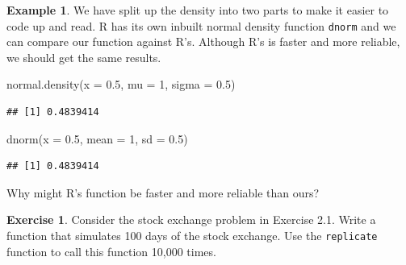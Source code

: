 \documentclass[
]{book}
\newenvironment{Shaded}{\begin{snugshade}}{\end{snugshade}}
\newcommand{\AttributeTok}[1]{\textcolor[rgb]{0.77,0.63,0.00}{#1}}
\newcommand{\DecValTok}[1]{\textcolor[rgb]{0.00,0.00,0.81}{#1}}
\newcommand{\FloatTok}[1]{\textcolor[rgb]{0.00,0.00,0.81}{#1}}
\newcommand{\FunctionTok}[1]{\textcolor[rgb]{0.00,0.00,0.00}{#1}}
\newcommand{\NormalTok}[1]{#1}
\theoremstyle{definition}
\theoremstyle{definition}
\newtheorem{example}{Example}[chapter]
\theoremstyle{definition}
\newtheorem{exercise}{Exercise}[chapter]
\theoremstyle{definition}
\theoremstyle{remark}
\begin{document}
\begin{example}
We have split up the density into two parts to make it easier to code up and read. R has its own inbuilt normal density function \texttt{dnorm} and we can compare our function against R's. Although R's is faster and more reliable, we should get the same results.

\begin{Shaded}
\begin{Highlighting}[]
\FunctionTok{normal.density}\NormalTok{(}\AttributeTok{x =} \FloatTok{0.5}\NormalTok{, }\AttributeTok{mu =} \DecValTok{1}\NormalTok{, }\AttributeTok{sigma =} \FloatTok{0.5}\NormalTok{)}
\end{Highlighting}
\end{Shaded}

\begin{verbatim}
## [1] 0.4839414
\end{verbatim}

\begin{Shaded}
\begin{Highlighting}[]
\FunctionTok{dnorm}\NormalTok{(}\AttributeTok{x =} \FloatTok{0.5}\NormalTok{, }\AttributeTok{mean =} \DecValTok{1}\NormalTok{, }\AttributeTok{sd =} \FloatTok{0.5}\NormalTok{)}
\end{Highlighting}
\end{Shaded}

\begin{verbatim}
## [1] 0.4839414
\end{verbatim}

Why might R's function be faster and more reliable than ours?
\end{example}

\begin{exercise}
Consider the stock exchange problem in Exercise 2.1. Write a function that simulates 100 days of the stock exchange. Use the \texttt{replicate} function to call this function 10,000 times.
\end{exercise}
\end{document}
